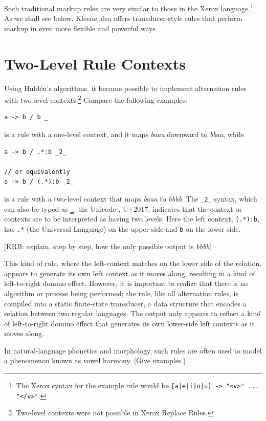 \noindent
Such traditional markup rules are very similar to those in the Xerox \xfst{}
language.\footnote{The Xerox syntax for the example rule would be
	\verb![a|e|i|o|u] -> "<v>" ... "</v>"!.}  As we shall see below, Kleene also offers transducer-style rules that perform
markup in even more flexible and powerful ways.

\section{Two-Level Rule Contexts}

Using Huld\'en's algorithms, it became possible to implement alternation rules with two-level contexts.\footnote{Two-level contexts
were not possible in Xerox Replace Rules.}
Compare the following examples:

\begin{Verbatim}
a -> b / b _
\end{Verbatim}

\noindent
is a rule with a one-level context, and it maps \emph{baaa} downward to
\emph{bbaa}, while

\begin{Verbatim}
a -> b / .*:b _2_

// or equivalently
a -> b / (.*):b _2_
\end{Verbatim}

\noindent
is a rule with a two-level context that maps \emph{baaa} to \emph{bbbb}.  The
\verb!_2_! syntax, which can also be typed as ‗, the Unicode
,  U+2017, indicates that the context or contexts are to be interpreted as
having two levels.  Here the left context, \verb!(.*):b!, has \verb!.*! (the Universal Language) on the upper side and \verb!b! on the
lower side.

[KRB:  explain, step by step, how the only possible output is
\emph{bbbb}]

This kind of rule, where the left-context matches on
the lower side of the relation, appears to generate its own left context as it moves
along, resulting in a kind of left-to-right domino effect.  However, it is
important to realize that there is no algorithm or process being performed; the rule,
like all alternation rules, is compiled into a static finite-state transducer, a data
structure that encodes a
relation between two regular languages.  The output only appears to reflect a kind of
left-to-right domino effect that generates its own lower-side left contexts as it
moves along.

In natural-language phonetics and morphology, such rules are often used to model a phenomenon known
as vowel harmony.  [Give examples.]

